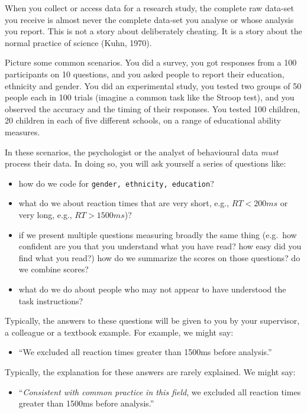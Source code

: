 \documentclass[
  letterpaper,
  DIV=11,
  numbers=noendperiod]{scrreprt}
\providecommand{\tightlist}{%
  \setlength{\itemsep}{0pt}\setlength{\parskip}{0pt}}\usepackage{longtable,booktabs,array}
\begin{document}
When you collect or access data for a research study, the complete raw
data-set you receive is almost never the complete data-set you analyse
or whose analysis you report. This is not a story about deliberately
cheating. It is a story about the normal practice of science (Kuhn,
1970).

Picture some common scenarios. You did a survey, you got responses from
a 100 participants on 10 questions, and you asked people to report their
education, ethnicity and gender. You did an experimental study, you
tested two groups of 50 people each in 100 trials (imagine a common task
like the Stroop test), and you observed the accuracy and the timing of
their responses. You tested 100 children, 20 children in each of five
different schools, on a range of educational ability measures.

In these scenarios, the psychologist or the analyst of behavioural data
\emph{must} process their data. In doing so, you will ask yourself a
series of questions like:

\begin{itemize}
\tightlist
\item
  how do we code for \texttt{gender,\ ethnicity,\ education}?
\item
  what do we about reaction times that are very short, e.g.,
  \(RT < 200ms\) or very long, e.g., \(RT > 1500ms\))?
\item
  if we present multiple questions measuring broadly the same thing
  (e.g.~how confident are you that you understand what you have read?
  how easy did you find what you read?) how do we summarize the scores
  on those questions? do we combine scores?
\item
  what do we do about people who may not appear to have understood the
  task instructions?
\end{itemize}

Typically, the answers to these questions will be given to you by your
supervisor, a colleague or a textbook example. For example, we might
say:

\begin{itemize}
\tightlist
\item
  ``We excluded all reaction times greater than 1500ms before
  analysis.''
\end{itemize}

Typically, the explanation for these answers are rarely explained. We
might say:

\begin{itemize}
\tightlist
\item
  ``\emph{Consistent with common practice in this field}, we excluded
  all reaction times greater than 1500ms before analysis.''
\end{itemize}
\end{document}
